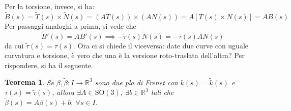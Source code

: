 \documentclass[12pt]{scrartcl}
\theoremstyle{style}
\newtheorem{teorema}{Teorema}[section]
\numberwithin{equation}{subsection}
\begin{document}
Per la torsione, invece, si ha:
\[
\widetilde{B}(s) = \widetilde{T}(s) \times \widetilde{N}(s) = (AT(s)) \times (AN(s)) = A\left[ T(s) \times N(s) \right] = A B(s)
\] 
Per passaggi analoghi a prima, si vede che 
\[
\widetilde{B}'(s) = A B'(s) \implies -\widetilde{\tau }(s) \widetilde{N}(s) = - \tau (s) A N(s)
\] 
da cui $\widetilde{\tau }(s) = \tau (s)$.
Ora ci si chiede il viceversa: date due curve con uguale curvatura e torsione, \`e vero che una \`e la versione roto-traslata dell'altra?
Per rispondere, si ha il seguente.
\begin{teorema}
	Se $\beta ,\widetilde{\beta }:I\to\mathbb{R}^3$ sono due pla di Frenet con $k(s) = \widetilde{k}(s)$ e $\tau (s)= \widetilde{\tau }(s)$, allora $\exists A \in \mathrm{SO} (3), \ \exists b \in \mathbb{R}^3$ tali che $\widetilde{\beta }(s) = A \beta (s) + b , \ \forall s \in I$.
\end{teorema}
\end{document}
